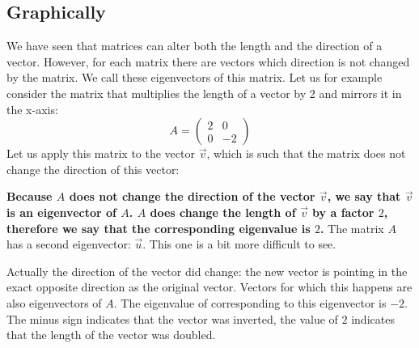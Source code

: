 \documentclass[a4paper]{report}
\begin{document}
\subsection{Graphically}
We have seen that matrices can alter both the length and the direction of a vector. However, for each matrix there are vectors which direction is not changed by the matrix. We call these eigenvectors of this matrix. Let us for example consider the matrix that multiplies the length of a vector by 2 and mirrors it in the x-axis:
\begin{equation}
A = \begin{pmatrix} 2 & 0 \\ 0 & -2 \end{pmatrix}
\end{equation}
Let us apply this matrix to the vector $\vec{v}$, which is such that the matrix does not change the direction of this vector:
\begin{center}
\end{center}
\textbf{Because $A$ does not change the direction of the vector $\vec{v}$, we say that $\vec{v}$ is an eigenvector of $A$. $A$ does change the length of $\vec{v}$ by a factor $2$, therefore we say that the corresponding eigenvalue is $2$.} The matrix $A$ has a second eigenvector: $\vec{u}$. This one is a bit more difficult to see.
\begin{center}
\end{center}
Actually the direction of the vector did change: the new vector is pointing in the exact opposite direction as the original vector. Vectors for which this happens are also eigenvectors of $A$. The eigenvalue of corresponding to this eigenvector is $-2$. The minus sign indicates that the vector was inverted, the value of $2$ indicates that the length of the vector was doubled.
\end{document}
